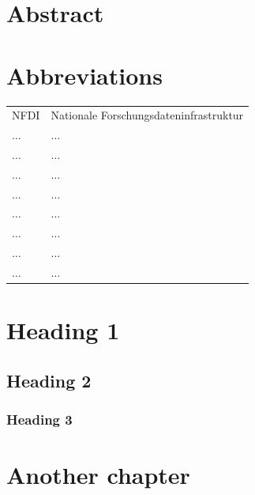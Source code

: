 \documentclass[headsepline,titlepage,twoside,12pt,toc=flat,headings=normal]{scrreprt}
\begin{document}
\chapter*{Abstract}\label{ch:abstract}

\chapter*{Abbreviations}
\begin{tabularx}{\textwidth}{lX}
NFDI					&Nationale Forschungsdateninfrastruktur\\
$\ldots$				&$\ldots$\\
$\ldots$				&$\ldots$\\
$\ldots$				&$\ldots$\\
$\ldots$				&$\ldots$\\
$\ldots$				&$\ldots$\\
$\ldots$				&$\ldots$\\
$\ldots$				&$\ldots$\\
$\ldots$				&$\ldots$\\
\end{tabularx}

\tableofcontents

\chapter{Heading 1}\label{ch:firstchapter}
\section{Heading 2}
\subsection{Heading 3}
\lipsum[1-5]%

\chapter{Another chapter}\label{ch:anotherchapter}
\end{document}
